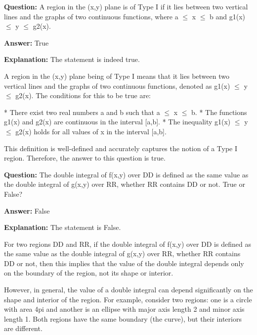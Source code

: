 \documentclass{article}
\begin{document}
                \vspace{0.5cm} 
        
            
                \textbf {Question:} A region in the (x,y) plane is of Type I if it lies between two vertical lines and the graphs of two continuous functions, where a \ensuremath{\leq} x \ensuremath{\leq} b and g1(x) \ensuremath{\leq} y \ensuremath{\leq} g2(x).
                
                \textbf{Answer:} True

                \textbf{Explanation:} The statement is indeed true.

A region in the (x,y) plane being of Type I means that it lies between two vertical lines and the graphs of two continuous functions, denoted as g1(x) \ensuremath{\leq} y \ensuremath{\leq} g2(x). The conditions for this to be true are:

* There exist two real numbers a and b such that a \ensuremath{\leq} x \ensuremath{\leq} b.
* The functions g1(x) and g2(x) are continuous in the interval [a,b].
* The inequality g1(x) \ensuremath{\leq} y \ensuremath{\leq} g2(x) holds for all values of x in the interval [a,b].

This definition is well-defined and accurately captures the notion of a Type I region. Therefore, the answer to this question is true.
                
                \vspace{0.5cm} 
        
            
                \textbf {Question:} The double integral of f(x,y) over DD is defined as the same value as the double integral of g(x,y) over RR, whether RR contains DD or not. True or False?
                
                \textbf{Answer:} False

                \textbf{Explanation:} The statement is False.

For two regions DD and RR, if the double integral of f(x,y) over DD is defined as the same value as the double integral of g(x,y) over RR, whether RR contains DD or not, then this implies that the value of the double integral depends only on the boundary of the region, not its shape or interior.

However, in general, the value of a double integral can depend significantly on the shape and interior of the region. For example, consider two regions: one is a circle with area 4pi and another is an ellipse with major axis length 2 and minor axis length 1. Both regions have the same boundary (the curve), but their interiors are different.
\end{document}

